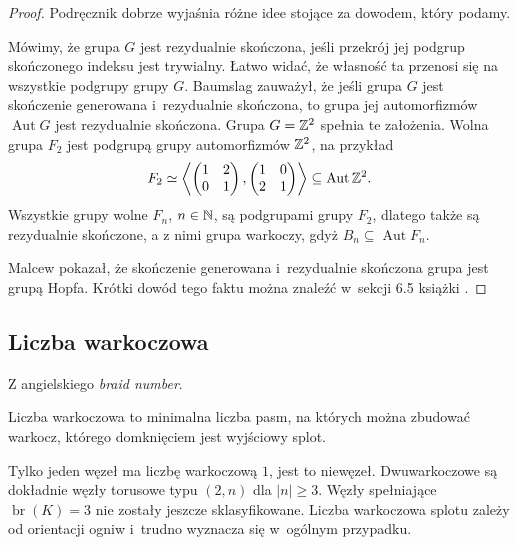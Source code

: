 \begin{proof}
    Podręcznik \cite{magnus66} dobrze wyjaśnia różne idee stojące za dowodem, który podamy.

    Mówimy, że grupa $G$ jest rezydualnie skończona, jeśli przekrój jej podgrup skończonego indeksu jest trywialny.
    Łatwo widać, że własność ta przenosi się na wszystkie podgrupy grupy $G$.
    Baumslag zauważył, że jeśli grupa $G$ jest skończenie generowana i~rezydualnie skończona, to grupa jej automorfizmów $\operatorname{Aut} G$ jest rezydualnie skończona.
    Grupa $G = \mathbb Z^2$ spełnia te założenia.
    Wolna grupa $F_2$ jest podgrupą grupy automorfizmów $\mathbb Z^2$, na przykład
    \begin{equation}
        F_2 \simeq \left\langle
        \begin{pmatrix}
            1 & 2 \\
            0 & 1
        \end{pmatrix},
        \begin{pmatrix}
            1 & 0 \\
            2 & 1
        \end{pmatrix}
        \right\rangle \subseteq \operatorname{Aut} \mathbb Z^2.
    \end{equation}
    Wszystkie grupy wolne $F_n$, $n \in \mathbb N$, są podgrupami grupy $F_2$, dlatego także są rezydualnie skończone, a z nimi grupa warkoczy, gdyż $B_n \subseteq \operatorname{Aut} F_n$.

    Malcew pokazał, że skończenie generowana i~rezydualnie skończona grupa jest grupą Hopfa.
    Krótki dowód tego faktu można znaleźć w~sekcji 6.5 książki \cite{magnus66}.
\end{proof}

\subsection{Liczba warkoczowa} %
\label{sub:braid_number}
Z angielskiego \emph{braid number}.

\begin{definition}
    Liczba warkoczowa to minimalna liczba pasm, na których można zbudować warkocz, którego domknięciem jest wyjściowy splot.
\end{definition}

Tylko jeden węzeł ma liczbę warkoczową $1$, jest to niewęzeł.
Dwuwarkoczowe są dokładnie węzły torusowe typu $(2, n)$ dla $|n| \ge 3$.
Węzły spełniające $\operatorname{br} (K) = 3$ nie zostały jeszcze sklasyfikowane.
Liczba warkoczowa splotu zależy od orientacji ogniw i~trudno wyznacza się w~ogólnym przypadku.

